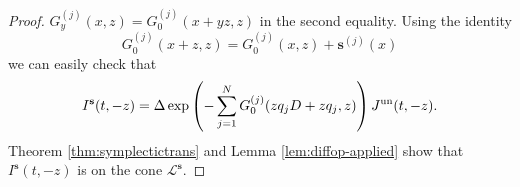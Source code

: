 \documentclass[11pt]{amsart}
\theoremstyle{definition} %
\theoremstyle{remark} %
\newcommand{\un}{{\rm un}}
\def\nn{N}
\newcommand{\bs}{\mathbf{s}}
\newcommand{\cL}{\mathcal{L}}
\newcommand{\cH}{\mathcal{H}}
\begin{document}
\begin{proof}
$G^{(j)}_y(x,z) = G^{(j)}_0(x + yz, z)$ 
in the second equality. 
Using the identity 
\[
G^{(j)}_0(x+z,z)=G^{(j)}_0(x,z)+\bs^{(j)}(x) 
\]
we can easily check that 
\[
I^\bs(t,-z) = \Delta \exp\left(-\sum_{j=1}^N 
G_0^{(j)}(zq_j D+zq_j,z)\right)J^\un(t,-z). 
\]
Theorem \ref{thm:symplectictrans} and Lemma \ref{lem:diffop-applied} 
show that $I^\bs(t,-z)$ is on the cone $\cL^{\bs}$. 
%
%
\end{proof}
\end{document}
